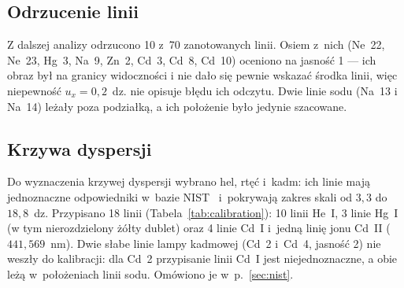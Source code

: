 \documentclass[12pt, a4paper]{article}
\begin{document}
\subsection{Odrzucenie linii}

Z dalszej analizy odrzucono 10 z~70 zanotowanych linii. Osiem z~nich (Ne~22, Ne~23,
Hg~3, Na~9, Zn~2, Cd~3, Cd~8, Cd~10) oceniono na jasność 1 --- ich obraz był na granicy
widoczności i nie dało się pewnie wskazać środka linii, więc niepewność $u_x = 0{,}2$~dz.
nie opisuje błędu ich odczytu. Dwie linie sodu (Na~13 i Na~14) leżały poza podziałką,
a ich położenie było jedynie szacowane.

\subsection{Krzywa dyspersji}\label{sec:dispersion_fit}

Do wyznaczenia krzywej dyspersji wybrano hel, rtęć i~kadm: ich linie mają jednoznaczne
odpowiedniki w~bazie NIST~\cite{nist} i~pokrywają zakres skali od $3{,}3$ do $18{,}8$~dz.
Przypisano 18 linii (Tabela~\ref{tab:calibration}): 10 linii He~I, 3 linie Hg~I
(w tym nierozdzielony żółty dublet) oraz 4 linie Cd~I i~jedną linię jonu Cd~II
($441{,}569$~nm). Dwie słabe linie lampy kadmowej (Cd~2 i~Cd~4, jasność 2) nie weszły
do kalibracji: dla Cd~2 przypisanie linii Cd~I jest niejednoznaczne, a obie leżą w~położeniach
linii sodu. Omówiono je w~p.~\ref{sec:nist}.
\end{document}
